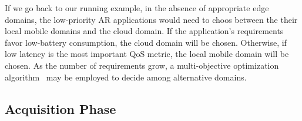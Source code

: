 

If we go back to our running example, in the absence of appropriate edge domains, the low-priority AR applications would need to choos between the their local mobile domains and the cloud domain. If the application's requirements favor low-battery consumption, the cloud domain will be chosen. Otherwise, if low latency is the most important QoS metric, the local mobile domain will be chosen. As the number of requirements grow, a multi-objective optimization algorithm~\cite{Olson1996} may be employed to decide among alternative domains.







\subsection*{Acquisition Phase}\label{sec:A3-E-acquisition}


